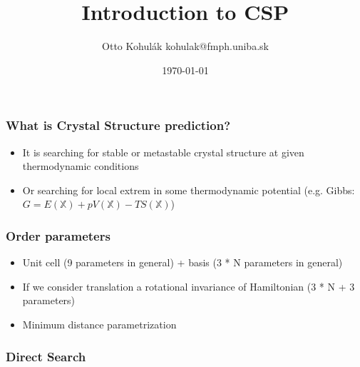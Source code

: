 \documentclass{beamer}
\begin{document}
\title{Introduction to CSP}   
\author{Otto Kohul\'{a}k \newline kohulak@fmph.uniba.sk} 
\date{\today} 

\frame{\titlepage} 

\begin{frame}
  \frametitle{What is Crystal Structure prediction?}
  \begin{itemize}
    \item It is searching for stable or metastable crystal structure at given thermodynamic conditions
    \item Or searching for local extrem in some thermodynamic potential (e.g. Gibbs: $ G = E(\mathbb{X}) + pV(\mathbb{X}) - TS(\mathbb{X}) $)
  \end{itemize}
\end{frame}

\begin{frame}
  \frametitle{Order parameters}
  \begin{itemize}
    \item Unit cell (9 parameters in general) + basis (3 * N parameters in general)
    \item If we consider translation a rotational invariance of Hamiltonian (3 * N + 3 parameters)
    \item Minimum distance parametrization \cite{pauschenwein2009}
  \end{itemize}
\end{frame}

\begin{frame}
  \frametitle{Direct Search}
\end{frame}

\printbibliography

%
\end{document}
